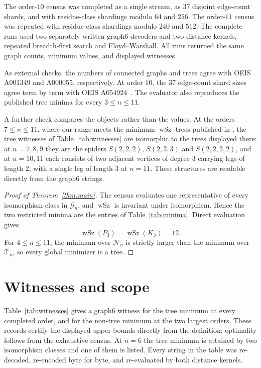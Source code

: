 \documentclass[11pt]{amsart}
\newcommand{\wSz}{\operatorname{wSz}}
\newcommand{\G}{\mathcal{G}}
\newcommand{\T}{\mathcal{T}}
\newcommand{\N}{\mathcal{N}}
\begin{document}
The order-$10$ census was completed as a single stream, as $37$
disjoint edge-count shards, and with residue-class shardings modulo
$64$ and $256$. The order-$11$ census was repeated with
residue-class shardings modulo $240$ and $512$. The complete runs
used two separately written graph6 decoders and two distance kernels,
repeated breadth-first search and Floyd--Warshall. All runs returned
the same graph counts, minimum values, and displayed witnesses.

As external checks, the numbers of connected graphs and trees agree
with OEIS A001349 and A000055, respectively. At order $10$, the $37$
edge-count shard sizes agree term by term with OEIS
A054924~\cite{OEIS}. The evaluator also reproduces the published tree
minima for every $3\le n\le 11$.

A further check compares the objects rather than the values. At the
orders $7\le n\le 11$, where our range meets the minimum-$\wSz$ trees
published in \cite[Table~1]{BokEtAl2019}, the tree witnesses of
Table~\ref{tab:witnesses} are isomorphic to the trees displayed there:
at $n=7,8,9$ they are the spiders $S(2,2,2)$, $S(2,2,3)$ and
$S(2,2,2,2)$, and at $n=10,11$ each consists of two adjacent vertices
of degree $3$ carrying legs of length $2$, with a single leg of
length $3$ at $n=11$. These structures are readable directly from the
graph6 strings.

\begin{proof}[Proof of Theorem~\ref{thm:main}]
The census evaluates one representative of every isomorphism class
in $\G_n$, and $\wSz$ is invariant under isomorphism. Hence the two
restricted minima are the entries of Table~\ref{tab:minima}. Direct
evaluation gives
\[
  \wSz(P_3)=\wSz(K_3)=12.
\]
For $4\le n\le 11$, the minimum over $\N_n$ is strictly larger than
the minimum over $\T_n$, so every global minimizer is a tree.
\end{proof}

\section{Witnesses and scope}\label{sec:witnesses}

Table~\ref{tab:witnesses} gives a graph6 witness for the tree minimum
at every completed order, and for the non-tree minimum at the two
largest orders. These records certify the displayed upper bounds
directly from the definition; optimality follows from the exhaustive
census. At $n=6$ the tree minimum is attained by two isomorphism
classes and one of them is listed. Every string in the table was
re-decoded, re-encoded byte for byte, and re-evaluated by both
distance kernels.
\end{document}
